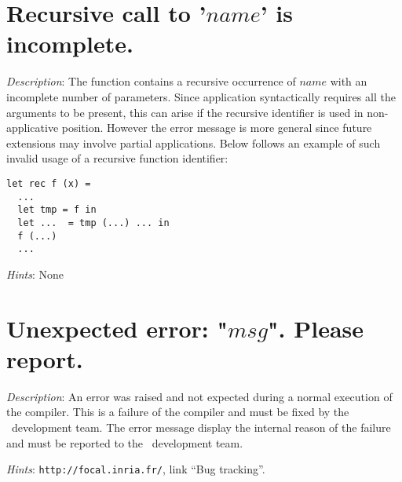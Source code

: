 \section*{Recursive call to '$name$' is incomplete.}

{\em Description}: The function contains a recursive occurrence of
$name$ with an incomplete number of parameters. Since application
syntactically requires all the arguments to be present, this can arise
if the recursive identifier is used in non-applicative
position. However the error message is more general since future
extensions may involve partial applications. Below follows an example
of such invalid usage of a recursive function identifier:
{\scriptsize
\begin{lstlisting}
let rec f (x) =
  ...
  let tmp = f in
  let ...  = tmp (...) ... in
  f (...)
  ...
\end{lstlisting}
}

{\em Hints}: None



\section*{Unexpected error: "$msg$". Please report.}

{\em Description}: An error was raised and not expected during a
normal execution of the compiler. This is a failure of the compiler
and must be fixed by the \focal\ development team. The error message
display the internal reason of the failure and must be reported to the
\focal\ development team.

{\em Hints}: \verb+http://focal.inria.fr/+, link ``Bug tracking''.
